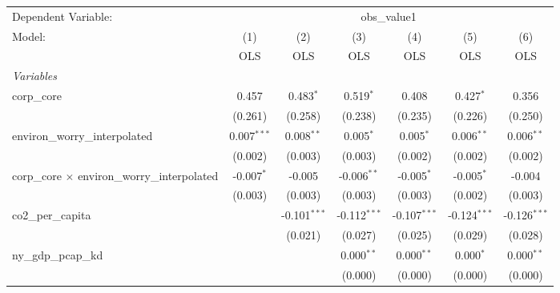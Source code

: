 
\begingroup
\centering
\begin{tabular}{lcccccc}
   \toprule
   Dependent Variable: & \multicolumn{6}{c}{obs\_value1}\\
   Model:                                               & (1)           & (2)            & (3)            & (4)            & (5)            & (6)\\  
                                                        &  OLS          & OLS            & OLS            & OLS            & OLS            & OLS\\  
   \midrule
   \emph{Variables}\\
   corp\_core                                           & 0.457         & 0.483$^{*}$    & 0.519$^{*}$    & 0.408          & 0.427$^{*}$    & 0.356\\   
                                                        & (0.261)       & (0.258)        & (0.238)        & (0.235)        & (0.226)        & (0.250)\\   
   environ\_worry\_interpolated                         & 0.007$^{***}$ & 0.008$^{**}$   & 0.005$^{*}$    & 0.005$^{*}$    & 0.006$^{**}$   & 0.006$^{**}$\\   
                                                        & (0.002)       & (0.003)        & (0.003)        & (0.002)        & (0.002)        & (0.002)\\   
   corp\_core $\times$ environ\_worry\_interpolated     & -0.007$^{*}$  & -0.005         & -0.006$^{**}$  & -0.005$^{*}$   & -0.005$^{*}$   & -0.004\\   
                                                        & (0.003)       & (0.003)        & (0.003)        & (0.003)        & (0.002)        & (0.003)\\   
   co2\_per\_capita                                     &               & -0.101$^{***}$ & -0.112$^{***}$ & -0.107$^{***}$ & -0.124$^{***}$ & -0.126$^{***}$\\   
                                                        &               & (0.021)        & (0.027)        & (0.025)        & (0.029)        & (0.028)\\   
   ny\_gdp\_pcap\_kd                                    &               &                & 0.000$^{**}$   & 0.000$^{**}$   & 0.000$^{*}$    & 0.000$^{**}$\\   
                                                        &               &                & (0.000)        & (0.000)        & (0.000)        & (0.000)\\   

\end{tabular}
